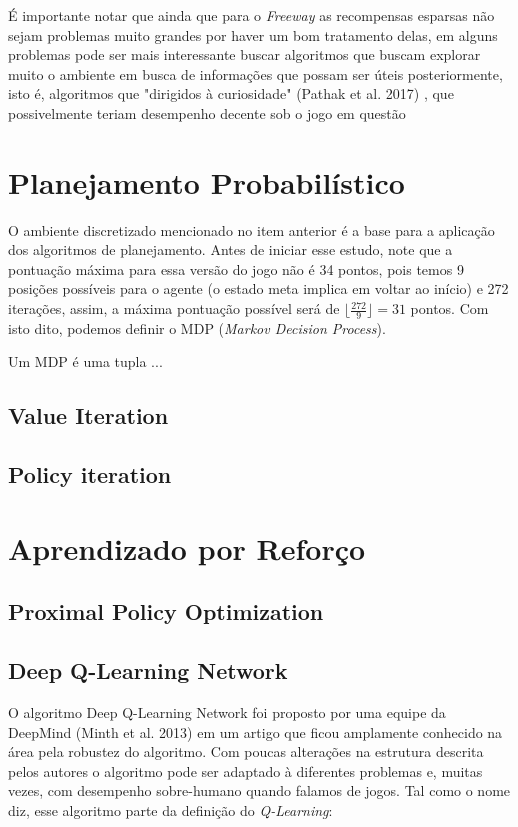 \documentclass[letterpaper]{article} %
\begin{document}
É importante notar que ainda que para o \textit{Freeway} as recompensas esparsas não sejam problemas muito grandes por haver um bom tratamento delas, em alguns problemas pode ser mais interessante buscar algoritmos que buscam explorar muito o ambiente em busca de informações que possam ser úteis posteriormente, isto é, algoritmos que "dirigidos à curiosidade" (Pathak et al. 2017) , que possivelmente teriam desempenho decente sob o jogo em questão 


\section{Planejamento Probabilístico}
O ambiente discretizado mencionado no item anterior é a base para a aplicação dos algoritmos de planejamento. Antes de iniciar esse estudo, note que a pontuação máxima para essa versão do jogo não é 34 pontos, pois temos 9 posições possíveis para o agente (o estado meta implica em voltar ao início) e 272 iterações, assim, a máxima pontuação possível será de $\lfloor \frac{272}{9}\rfloor = 31$ pontos. Com isto dito, podemos definir o MDP (\textit{Markov Decision Process}).

Um MDP é uma tupla ...


\subsection{Value Iteration}

\subsection{Policy iteration}

\section{Aprendizado por Reforço}

\subsection{Proximal Policy Optimization}



\subsection{Deep Q-Learning Network}
O algoritmo Deep Q-Learning Network foi proposto por uma equipe da DeepMind (Minth et al. 2013) em um artigo que ficou amplamente conhecido na área pela robustez do algoritmo. Com poucas alterações na estrutura descrita pelos autores o algoritmo pode ser adaptado à diferentes problemas e, muitas vezes, com desempenho sobre-humano quando falamos de jogos. Tal como o nome diz, esse algoritmo parte da definição do \textit{Q-Learning}:
\end{document}
